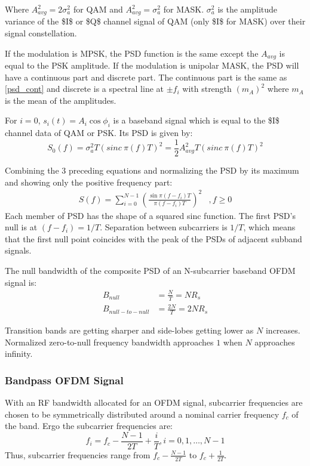 Where $A_{avg}^2 = 2\sigma_a^2$ for \gls{QAM} and $A_{avg}^2 = \sigma_a^2$ for \gls{MASK}. $\sigma_a^2$ is the amplitude variance of the \gls{$I$} or \gls{$Q$} channel signal of \gls{QAM} (only \gls{$I$} for MASK) over their signal constellation.

If the modulation is \gls{MPSK}, the \gls{PSD} function is the same except the $A_{avg}$ is equal to the \gls{PSK} amplitude. If the modulation is unipolar \gls{MASK}, the \gls{PSD} will have a continuous part and discrete part. The continuous part is the same as \eqref{psd_cont} and discrete is a spectral line at $\pm f_i$ with strength $\left( m_A\right)^2$ where $m_A$ is the mean of the amplitudes.

For $i=0$, $s_i(t) = A_i\cos\phi_i$ is a baseband signal which is equal to the \gls{$I$} channel data of \gls{QAM} or \gls{PSK}. Its \gls{PSD} is given by:
$$S_0(f) = \sigma_a^2T\left( sinc\ \pi (f)T\right)^2 = \frac{1}{2}A_{avg}^2T\left( sinc\ \pi (f)T\right)^2$$

Combining the 3 preceding equations and normalizing the \gls{PSD} by its maximum and showing only the positive frequency part:
\begin{align}
	\label{psd_gen}
	S(f) = \sum_{i=0}^{N-1}\left( \frac{\sin\pi(f-f_i)T}{\pi(f-f_i)T}\right)^2 &, f\geq 0
\end{align}
Each member of \gls{PSD} has the shape of a squared sinc function. The first \gls{PSD}'s null is at $(f-f_i)=1/T$. Separation between \gls{subcarrier}s is $1/T$, which means that the first null point coincides with the peak of the \gls{PSD}s of adjacent \gls{subband} signals.

The null bandwidth of the composite \gls{PSD} of an N-subcarrier baseband \gls{OFDM} signal is:
\begin{align*}
B_{null} &= \frac{N}{T} = NR_s\\
B_{null-to-null}&=\frac{2N}{T} = 2NR_s
\end{align*}

Transition bands are getting sharper and side-lobes getting lower as $N$ increases. Normalized zero-to-null frequency bandwidth approaches $1$ when $N$ approaches infinity.

\subsubsection{Bandpass \gls{OFDM} Signal}
With an \gls{RF} bandwidth allocated for an \gls{OFDM} signal, \gls{subcarrier} frequencies are chosen to be symmetrically distributed around a nominal carrier frequency $f_c$ of the band. Ergo the \gls{subcarrier} frequencies are:
$$f_i = f_c - \frac{N-1}{2T}+\frac{i}{T}, i=0,1,\ldots,N-1$$
Thus, \gls{subcarrier} frequencies range from $f_c - \frac{N-1}{2T}$ to $f_c + \frac{1}{2T}$.

